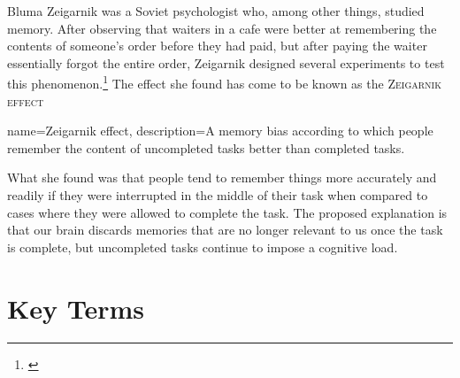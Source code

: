 Bluma Zeigarnik was a Soviet psychologist who, among other things, studied memory. After observing that waiters in a cafe were better at remembering the contents of someone's order before they had paid, but after paying the waiter essentially forgot the entire order, Zeigarnik designed several experiments to test this phenomenon.\footnote{\cite{zeigarnik1927}} The effect she found has come to be known as the \textsc{\Gls{Zeigarnik effect}}

{
name=Zeigarnik effect,
description={A memory bias according to which people remember the content of uncompleted tasks better than completed tasks.}
}

What she found was that people tend to remember things more accurately and readily if they were interrupted in the middle of their task when compared to cases where they were allowed to complete the task. The proposed explanation is that our brain discards memories that are no longer relevant to us once the task is complete, but uncompleted tasks continue to impose a cognitive load.

\section*{Key Terms}
\begin{fullwidth}
\begin{multicols}{2}
\begin{sortedlist}
\end{sortedlist}
\end{multicols}
\end{fullwidth}

